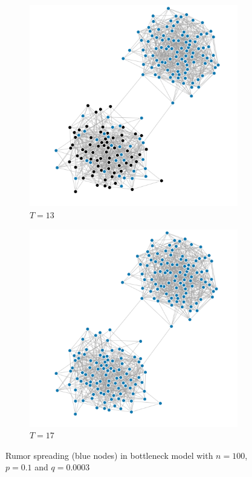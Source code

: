 \documentclass[10pt,journal,a4paper]{IEEEtran}
\begin{document}
\begin{figure}[h]
\begin{subfigure}[b]{.5\linewidth}
\includegraphics[width=1\linewidth]{figs/split-3}
\caption{$T=13$}
\end{subfigure}%
\begin{subfigure}[b]{.5\linewidth}
\includegraphics[width=1\linewidth]{figs/split-4}
\caption{$T=17$}
\end{subfigure}

\caption{Rumor spreading (blue nodes) in bottleneck model with $n=100$, $p = 0.1$ and $q = 0.0003$}
\label{barabasi-albert-graphs}
\end{figure}
\end{document}
